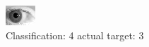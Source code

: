 \begin{figure}[h!]
\begin{center}
\includegraphics[width=0.60\columnwidth]{figures/ID222_class_4_target_3.png}
\end{center}
\caption{ Classification: 4 actual target: 3}
\label{fig:ID222_class_4_target_3}
\end{figure}
